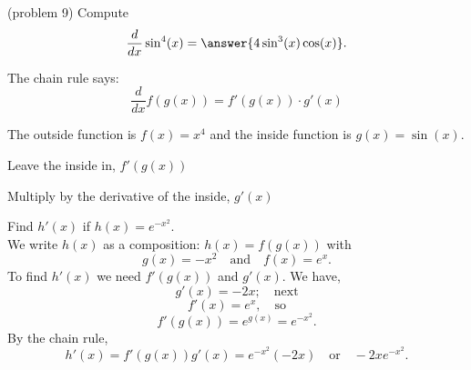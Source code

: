 \documentclass{ximera}
\begin{document}
\begin{center}
\begin{foldable}
\end{foldable}
\end{center}
 


\begin{problem}(problem 9)
  Compute
  \[
  \frac{d}{dx} \sin^4(x) = \answer{4\sin^3(x)\cos(x)}.
  \]
  
    \begin{hint}
      The chain rule says:
      \[
      \frac{d}{dx} f(g(x)) = f'(g(x))\cdot g'(x)
      \]
    \end{hint}
    \begin{hint}
      The outside function is $f(x) = x^4$ and the inside
      function is $g(x) = \sin(x)$.
    \end{hint}
    \begin{hint}
		  Leave the inside in, $f'(g(x))$
		\end{hint}
		\begin{hint}
		  Multiply by the derivative of the inside, $g'(x)$
		\end{hint}
    
\end{problem}



\begin{example}[example 10]
Find $h'(x)$ if $h(x) = e^{-x^2}$.\\
We write $h(x)$ as a composition: $h(x)=f(g(x))$ with 
\[g(x) = -x^2  \quad \text{and} \quad  f(x) =e^x.\]
 To find $h'(x)$ we need $f'(g(x))$ and $g'(x)$. We have, 
\[g'(x) = -2x; \quad \text{next} \] 
\[f'(x) = e^x, \quad \text{so} \]
\[f'(g(x)) = e^{g(x)} = e^{-x^2}.\]
By the chain rule,
\[h'(x) = f'(g(x))g'(x) = e^{-x^2} (-2x) \quad \text{or} \quad -2xe^{-x^2}.\]
\end{example}

\begin{center}
\begin{foldable}
\end{foldable}
\end{center}
 
\end{document}
